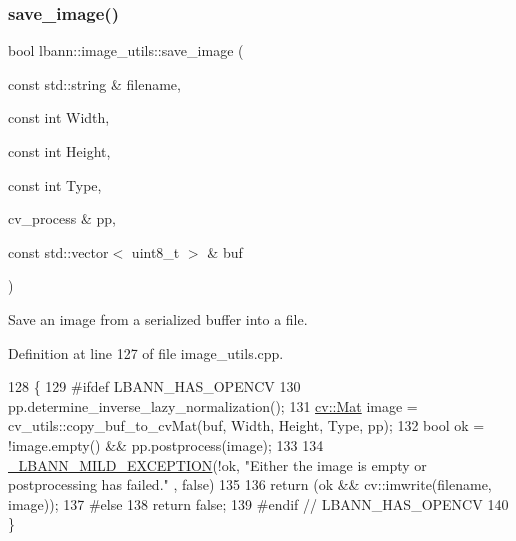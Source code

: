 \subsubsection{\texorpdfstring{save\+\_\+image()}{save\_image()}\hspace{0.1cm}{\footnotesize\ttfamily [1/2]}}
{\footnotesize\ttfamily bool lbann\+::image\+\_\+utils\+::save\+\_\+image (\begin{DoxyParamCaption}\item[{const std\+::string \&}]{filename,  }\item[{const int}]{Width,  }\item[{const int}]{Height,  }\item[{const int}]{Type,  }\item[{cv\+\_\+process \&}]{pp,  }\item[{const std\+::vector$<$ uint8\+\_\+t $>$ \&}]{buf }\end{DoxyParamCaption})\hspace{0.3cm}{\ttfamily [static]}}



Save an image from a serialized buffer into a file. 



Definition at line 127 of file image\+\_\+utils.\+cpp.


\begin{DoxyCode}
128                                                                                                            
                                 \{
129 \textcolor{preprocessor}{#ifdef LBANN\_HAS\_OPENCV}
130   pp.determine\_inverse\_lazy\_normalization();
131   \hyperlink{base_8hpp_a68f11fdc31b62516cb310831bbe54d73}{cv::Mat} image = cv\_utils::copy\_buf\_to\_cvMat(buf, Width, Height, Type, pp);
132   \textcolor{keywordtype}{bool} ok = !image.empty() && pp.postprocess(image);
133 
134   \hyperlink{mild__exception_8hpp_a7b8339c566152ab29ce66b63e90c67f9}{\_LBANN\_MILD\_EXCEPTION}(!ok, \textcolor{stringliteral}{"Either the image is empty or postprocessing has failed."}
      , \textcolor{keyword}{false})
135 
136   return (ok && cv::imwrite(filename, image));
137 \textcolor{preprocessor}{#else}
138   \textcolor{keywordflow}{return} \textcolor{keyword}{false};
139 \textcolor{preprocessor}{#endif // LBANN\_HAS\_OPENCV}
140 \}
\end{DoxyCode}
\mbox{\label{classlbann_1_1image__utils_a86e65a4c267319e77ae9e8c65033ac15}} 
